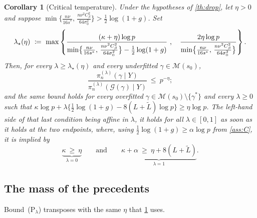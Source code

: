 \documentclass[aos]{imsart}
\newcommand{\Ltil}{\widetilde{L}}
\newcommand{\gainfloorsm}{%
    \min\bigl\{\tfrac{n\nu}{16s^{\ast}},\,
    \tfrac{n\nu^{2}C_\beta^{2}}{64\sigma_0^{2}}\bigr\}}
\theoremstyle{plain}
\newtheorem{corollary}{Corollary}[section]
\theoremstyle{definition}
\begin{document}
    \begin{corollary}[Critical temperature]
        \label{cor:critical}
        Under the hypotheses of \cref{th:drop}, let $\eta>0$ and suppose
        $\gainfloorsm>\tfrac12\log(1+g)$. Set
        \begin{equation}
            \label{eq:lambdastar}
            \lambda_\star(\eta)\ \coloneq\ \max\left\{
                                                   \frac{(\kappa+\eta)\log p}
                                                   {\gainfloorsm-\tfrac12\log(1+g)}\ ,\quad
                                                   \frac{2\eta\log p}{\gainfloorsm}\right\} .
        \end{equation}
        Then, for every $\lambda\geq\lambda_\star(\eta)$ and every underfitted
        $\gamma\in\mathscr{M}(s_0)$,
        \begin{equation}
            \label{eq:underconc}
            \frac{\pi_n^{(\lambda)}(\gamma\mid Y)}
            {\pi_n^{(\lambda)}(\mathcal{G}(\gamma)\mid Y)}
            \ \leq\ p^{-\eta} ;
        \end{equation}
        and the same bound holds for every overfitted
        $\gamma\in\mathscr{M}(s_0)\setminus\{\gamma^{\ast}\}$ and every
        $\lambda\geq0$ such that
        $\kappa\log p+\lambda\{\tfrac12\log(1+g)-8(L+\Ltil)\log p\}
        \geq\eta\log p$. The left-hand side of that last condition being
        affine in $\lambda$, it holds for all $\lambda\in[0,1]$ as soon as it
        holds at the two endpoints, where, using
        $\tfrac12\log(1+g)\geq\alpha\log p$ from \cref{ass:C}, it is implied
        by
        \begin{equation}
            \label{eq:endpoints}
            \underbrace{\kappa\ \geq\ \eta}_{\lambda=0}
            \qquad\text{and}\qquad
            \underbrace{\kappa+\alpha\ \geq\ \eta+8(L+\Ltil)}_{\lambda=1} .
        \end{equation}
    \end{corollary}

    \subsection{The mass of the precedents}
    \label{sub:precedents}


    Bound~(P$_\lambda$) transposes with the same $\eta$ that
    \cref{cor:critical} uses.
\end{document}
